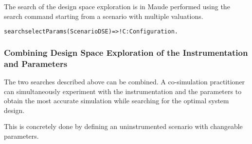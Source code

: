 The search of the design space exploration is in Maude performed using the search command starting from a scenario with multiple valuations.
\begin{alltt}
  \small
  search selectParams(ScenarioDSE)  =>! C:Configuration .
\end{alltt}

\subsubsection{Combining Design Space Exploration of the Instrumentation and Parameters}
The two searches described above can be combined. A co-simulation practitioner can simultaneously experiment with the instrumentation and the parameters to obtain the most accurate simulation while searching for the optimal system design.

This is concretely done by defining an uninstrumented scenario with changeable parameters.

